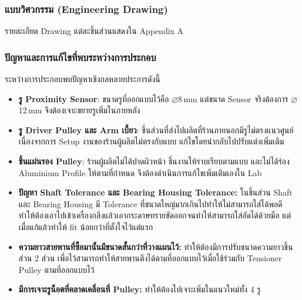 
\subsubsection{แบบวิศวกรรม (Engineering Drawing)}
\label{subsubsec:engineering_drawing}




รายละเอียด Drawing แต่ละชิ้นส่วนแสดงใน Appendix A

\subsubsection{ปัญหาและการแก้ไขที่พบระหว่างการประกอบ}
\label{subsubsec:assembly_issues}

ระหว่างการประกอบพบปัญหาเชิงกลหลายประการดังนี้

\begin{itemize}
  \item \textbf{รู Proximity Sensor}: ขนาดรูที่ออกแบบไว้คือ
        $\diameter$8\,mm แต่ขนาด Sensor จริงต้องการ $\diameter$12\,mm
        จึงต้องเจาะขยายรูเพิ่มในภายหลัง
  \item \textbf{รู Driver Pulley และ Arm เบี้ยว}:
        ชิ้นส่วนที่ส่งไปผลิตที่ร้านภายนอกมีรูไม่ตรงแนวศูนย์
        เนื่องจากการ Setup งานของร้านผู้ผลิตไม่ตรงกับแบบ
        แก้ไขโดยนำกลับไปปรับแต่งเพิ่มเติม
  \item \textbf{ชิ้นแผ่นรอง Pulley}: ร้านผู้ผลิตไม่ได้ปาดผิวหน้า
        ชิ้นงานให้ราบเรียบตามแบบ และไม่ได้ร่อง Aluminium Profile
        ให้ตามที่กำหนด จึงต้องดำเนินการแก้ไขเพิ่มเติมเองใน Lab
  \item \textbf{ปัญหา Shaft Tolerance และ Bearing Housing Tolerance:} 
      ในชิ้นส่วน Shaft และ Bearing Housing มี Tolerance ที่ขนาดใหญ่มากเกินไปทำให้ไม่สามารถใส่ได้พอดี ทำให้ต้องเอาไปเข้าเครื่องกลึงแล้วเอากระดาษทรายขัดออกจนทำให้สามารถใส่อัดได้ด้วยมือ แต่เมื่อแก้แล้วทำให้ fit น้อยกว่าที่ตั้งใจไว้แต่แรก
  \item \textbf{ความยาวสายพานที่ซื้อมานั้นมีขนาดสั้นกว่าที่วางแผนไว้:} 
      ทำให้ต้องมีการปรับขนาดความยาวชิ้นส่วน 2 ส่วน เพื่อไว้สามารถทำให้สายพานตึงได้ตามที่ออกแบบไว้เมื่อใช้ร่วมกับ Tensioner Pulley ตามที่ออกแบบไว้
  \item \textbf{มีการเจาะรูน็อตที่คลาดเคลื่อนที่ Pulley:} 
      ทำให้ต้องไปเจาะเพิ่มในแนวใหม่ทั้ง 4 รู
\end{itemize}

